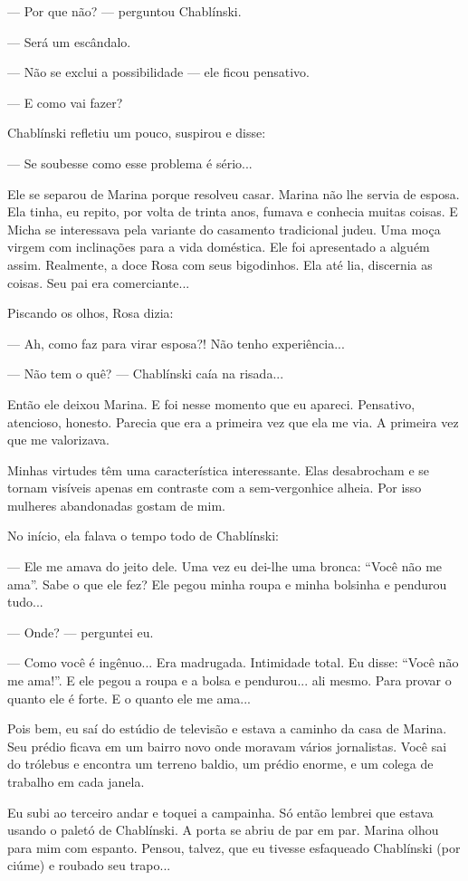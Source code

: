 --- Por que não? --- perguntou Chablínski.

--- Será um escândalo.

--- Não se exclui a possibilidade --- ele ficou pensativo.

--- E como vai fazer?

Chablínski refletiu um pouco, suspirou e disse:

--- Se soubesse como esse problema é sério...

Ele se separou de Marina porque resolveu casar. Marina não lhe servia de
esposa. Ela tinha, eu repito, por volta de trinta anos, fumava e
conhecia muitas coisas. E Micha se interessava pela variante do
casamento tradicional judeu. Uma moça virgem com inclinações para a vida
doméstica. Ele foi apresentado a alguém assim. Realmente, a doce Rosa
com seus bigodinhos. Ela até lia, discernia as coisas. Seu pai era
comerciante...

Piscando os olhos, Rosa dizia:

--- Ah, como faz para virar esposa?! Não tenho experiência...

--- Não tem o quê? --- Chablínski caía na risada...

Então ele deixou Marina. E foi nesse momento que eu apareci. Pensativo,
atencioso, honesto. Parecia que era a primeira vez que ela me via. A
primeira vez que me valorizava.

Minhas virtudes têm uma característica interessante. Elas desabrocham e
se tornam visíveis apenas em contraste com a sem-vergonhice alheia. Por
isso mulheres abandonadas gostam de mim.

No início, ela falava o tempo todo de Chablínski:

--- Ele me amava do jeito dele. Uma vez eu dei-lhe uma bronca: ``Você
não me ama''. Sabe o que ele fez? Ele pegou minha roupa e minha bolsinha
e pendurou tudo...

--- Onde? --- perguntei eu.

--- Como você é ingênuo... Era madrugada. Intimidade total. Eu disse:
``Você não me ama!''. E ele pegou a roupa e a bolsa e pendurou... ali
mesmo. Para provar o quanto ele é forte. E o quanto ele me ama...

Pois bem, eu saí do estúdio de televisão e estava a caminho da casa de
Marina. Seu prédio ficava em um bairro novo onde moravam vários
jornalistas. Você sai do trólebus e encontra um terreno baldio, um
prédio enorme, e um colega de trabalho em cada janela.

Eu subi ao terceiro andar e toquei a campainha. Só então lembrei que
estava usando o paletó de Chablínski. A porta se abriu de par em par.
Marina olhou para mim com espanto. Pensou, talvez, que eu tivesse
esfaqueado Chablínski (por ciúme) e roubado seu trapo...

